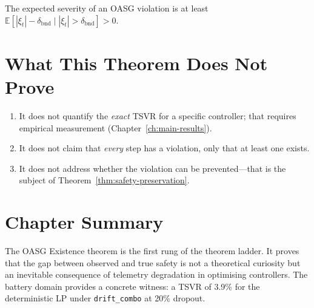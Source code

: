 \begin{corollary}
\label{cor:oasg-severity}
The expected severity of an OASG violation is at least
$\mathbb{E}[|\xi_t| - \delta_{\text{bnd}} \mid |\xi_t| > \delta_{\text{bnd}}] > 0$.
\end{corollary}

\section{What This Theorem Does Not Prove}

\begin{enumerate}
  \item It does not quantify the \emph{exact} TSVR for a specific
    controller; that requires empirical measurement (Chapter~\ref{ch:main-results}).
  \item It does not claim that \emph{every} step has a violation, only
    that at least one exists.
  \item It does not address whether the violation can be prevented---that
    is the subject of Theorem~\ref{thm:safety-preservation}.
\end{enumerate}

\section{Chapter Summary}

The OASG Existence theorem is the first rung of the theorem ladder.
It proves that the gap between observed and true safety is not a
theoretical curiosity but an inevitable consequence of telemetry
degradation in optimising controllers.  The battery domain provides
a concrete witness: a TSVR of 3.9\% for the deterministic LP under
\texttt{drift\_combo} at 20\% dropout.

\begingroup
\def\domainblockid{t1}
\def\domainblocktitle{T1}
\endgroup
